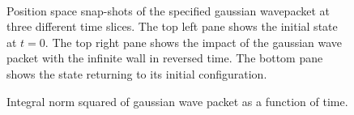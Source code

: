 \documentclass[singlepage,notitlepage,nofootinbib,11pt]{revtex4-1}
\begin{document}
\begin{figure}[h]
  \centering
  \captionsetup[subfigure]{labelformat=empty}
  \\
  \caption{\label{evolution} Position space snap-shots of the specified gaussian wavepacket at three different time slices. The top left pane shows the initial state at $t=0$. The top right pane shows the impact of the gaussian wave packet with the infinite wall in reversed time. The bottom pane shows the state returning to its initial configuration.}
\end{figure}
\begin{figure}[h]
  \centering
  \captionsetup[subfigure]{labelformat=empty}
  \caption{\label{unitarity} Integral norm squared of gaussian wave packet as a function of time. }
\end{figure}
\end{document}
